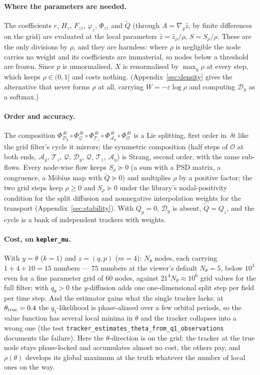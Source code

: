 \documentclass[11pt,a4paper]{article}
\newcommand{\zh}{\hat{z}}
\newcommand{\zr}{\hat{z}_{\rho}}   %
\newcommand{\Sr}{S_{\rho}}          %
\newcommand{\eps}{\varepsilon}
\newcommand{\gy}{\nabla_{\!y}}
\newcommand{\dt}{\,\delta t}
\theoremstyle{plain}
\theoremstyle{definition}
\theoremstyle{remark}
\begin{document}
\paragraph{Where the parameters are needed.}
The coefficients $r$, $H_z$, $F_{zz}$, $\varphi_z$, $\Phi_{zz}$ and $\tilde Q$ (through $A=\gy\zh$, by finite differences on the grid) are evaluated at the local parameters $\zh=\zr/\rho$, $S=\Sr/\rho$. These are the only divisions by $\rho$, and they are harmless: where $\rho$ is negligible the node carries no weight and its coefficients are immaterial, so nodes below a threshold are frozen. Since $p$ is unnormalised, $X$ is renormalised by $\max_y\rho$ at every step, which keeps $\rho\in(0,1]$ and costs nothing. (Appendix~\ref{sec:density} gives the alternative that never forms $\rho$ at all, carrying $W=-\eps\log\rho$ and computing $\mathcal D_y$ as a softmax.)

\paragraph{Order and accuracy.}
The composition $\Phi^{\dt}_{\mathcal D_y}\circ\Phi^{\dt}_{\mathcal Q}\circ\Phi^{\dt}_{\mathcal T_z}\circ\Phi^{\dt}_{\mathcal A_y}\circ\Phi^{\dt}_{\mathcal O}$ is a Lie splitting, first order in $\dt$ like the grid filter's cycle it mirrors; the symmetric composition (half steps of $\mathcal O$ at both ends, $\mathcal A_y$, $\mathcal T_z$, $\mathcal Q$, $\mathcal D_y$, $\mathcal Q$, $\mathcal T_z$, $\mathcal A_y$) is Strang, second order, with the same sub-flows. Every node-wise flow keeps $\Sr\succeq0$ (a sum with a PSD matrix, a congruence, a M\"obius map with $\tilde Q\succeq0$) and multiplies $\rho$ by a positive factor; the two grid steps keep $\rho\ge0$ and $\Sr\succeq0$ under the library's nodal-positivity condition for the split diffusion and nonnegative interpolation weights for the transport (Appendix~\ref{sec:stability}). With $Q_y=0$, $\mathcal D_y$ is absent, $\tilde Q=Q_z$, and the cycle is a bank of independent trackers with weights.

\paragraph{Cost, on \texttt{kepler\_mu}.}
With $y=\theta$ ($k=1$) and $z=(q,p)$ ($m=4$): $N_\theta$ nodes, each carrying $1+4+10 = 15$ numbers --- $75$ numbers at the viewer's default $N_\theta=5$, below $10^3$ even for a fine parameter grid of $60$ nodes, against $21^4N_\theta\approx10^6$ grid values for the full filter; with $q_\theta>0$ the $y$-diffusion adds one one-dimensional split step per field per time step. And the estimator gains what the single tracker lacks: at $\theta_{\rm true}=0.4$ the $q_1$-likelihood is phase-aliased over a few orbital periods, so the value function has several local minima in $\theta$ and the tracker collapses into a wrong one (the test \texttt{tracker\_estimates\_theta\_from\_q1\_observations} documents the failure). Here the $\theta$-direction is on the grid: the tracker at the true node stays phase-locked and accumulates almost no cost, the others pay, and $\rho(\theta)$ develops its global maximum at the truth whatever the number of local ones on the way.
\end{document}
